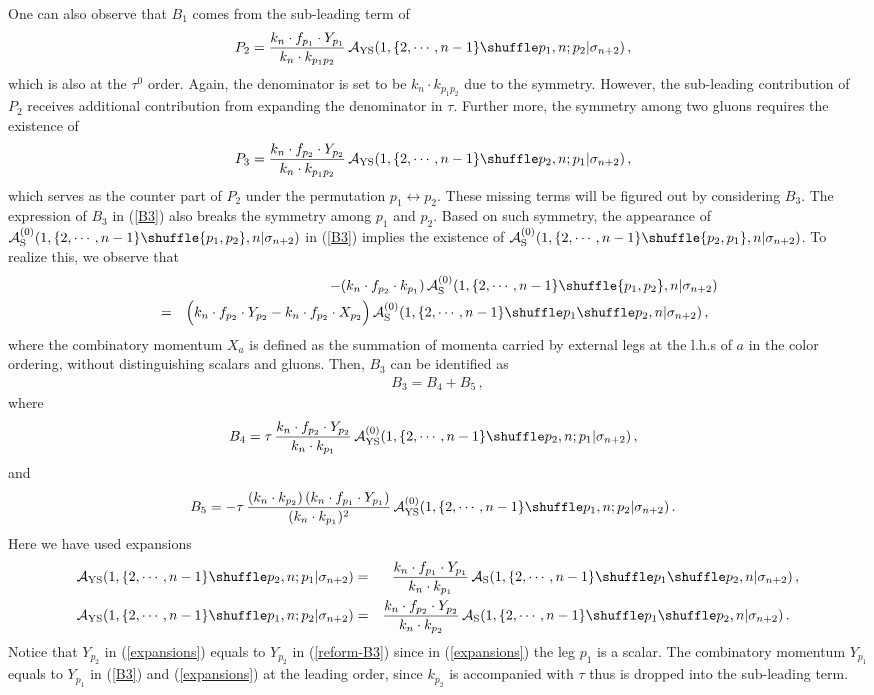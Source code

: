 \documentclass[11pt,a4paper]{article}
\newcommand{\bea}{\begin{eqnarray}}
\newcommand{\eea}{\end{eqnarray}}
\newcommand{\nn}{\nonumber \\}
\def\eref#1{(\ref{#1})}
\begin{document}
One can also observe that $B_1$ comes from the sub-leading term of
%
\bea
P_2={k_n\cdot f_{p_1}\cdot Y_{p_1}\over k_n\cdot k_{p_1p_2}}\,{\cal A}_{\rm YS}(1,\{2,\cdots,n-1\}\shuffle p_1,n;p_2|\sigma_{n+2})\,,~~\label{2g-P2}
\eea
%
which is also at the $\tau^0$ order. Again, the denominator is set to be $k_n\cdot k_{p_1p_2}$ due to the symmetry. However, the sub-leading contribution of $P_2$ receives additional contribution from expanding the denominator in $\tau$. Further more, the symmetry among two gluons requires the existence of
%
\bea
P_3={k_n\cdot f_{p_2}\cdot Y_{p_2}\over k_n\cdot k_{p_1p_2}}\,{\cal A}_{\rm YS}(1,\{2,\cdots,n-1\}\shuffle p_2,n;p_1|\sigma_{n+2})\,,~~\label{2g-P3}
\eea
%
which serves as the counter part of $P_2$ under the permutation $p_1\leftrightarrow p_2$.
These missing terms will be figured out by considering $B_3$. The expression of $B_3$ in \eref{B3} also breaks the symmetry among $p_1$ and $p_2$.
Based on such symmetry, the appearance of ${\cal A}^{(0)}_{\rm S}(1,\{2,\cdots,n-1\}\shuffle \{p_1,p_2\},n|\sigma_{n+2})$ in \eref{B3} implies the existence of ${\cal A}^{(0)}_{\rm S}(1,\{2,\cdots,n-1\}\shuffle \{p_2,p_1\},n|\sigma_{n+2})$. To realize this, we observe that
%
\bea
& &-(k_n\cdot f_{p_2}\cdot k_{p_1})\,{\cal A}^{(0)}_{\rm S}(1,\{2,\cdots,n-1\}\shuffle\{p_1,p_2\},n|\sigma_{n+2})\nn
&=&\Big(k_n\cdot f_{p_2}\cdot Y_{p_2}-k_n\cdot f_{p_2}\cdot X_{p_2} \Big)\,{\cal A}^{(0)}_{\rm S}(1,\{2,\cdots,n-1\}\shuffle p_1\shuffle p_2,n|\sigma_{n+2})\,,~~\label{reform-B3}
\eea
%
where the combinatory momentum $X_a$ is defined as the summation of momenta carried by external legs at the l.h.s of $a$ in the color ordering, without distinguishing scalars and gluons.
Then, $B_3$ can be identified as
%
\bea
B_3=B_4+B_5\,,
\eea
%
where
%
\bea
B_4=\tau\,{k_n\cdot f_{p_2}\cdot Y_{p_2}\over k_n\cdot k_{p_1}}\,{\cal A}^{(0)}_{\rm YS}(1,\{2,\cdots,n-1\}\shuffle p_2,n;p_1|\sigma_{n+2})\,,~~\label{B4}
\eea
%
and
%
\bea
B_5=-\tau\,{(k_n\cdot k_{p_2})\,(k_n\cdot f_{p_1}\cdot Y_{p_1})\over (k_n\cdot k_{p_1})^2}\,{\cal A}^{(0)}_{\rm YS}(1,\{2,\cdots,n-1\}\shuffle p_1,n;p_2|\sigma_{n+2})\,.~~\label{B5}
\eea
%
Here we have used expansions
%
\bea
{\cal A}_{\rm YS}(1,\{2,\cdots,n-1\}\shuffle p_2,n;p_1|\sigma_{n+2})&=&{k_n\cdot f_{p_1}\cdot Y_{p_1}\over k_n\cdot k_{p_1}}\,{\cal A}_{\rm S}(1,\{2,\cdots,n-1\}\shuffle p_1\shuffle p_2,n|\sigma_{n+2})\,,\nn
{\cal A}_{\rm YS}(1,\{2,\cdots,n-1\}\shuffle p_1,n;p_2|\sigma_{n+2})&=&{k_n\cdot f_{p_2}\cdot Y_{p_2}\over k_n\cdot k_{p_2}}\,{\cal A}_{\rm S}(1,\{2,\cdots,n-1\}\shuffle p_1\shuffle p_2,n|\sigma_{n+2})\,.~~\label{expansions}
\eea
%
Notice that $Y_{p_2}$ in \eref{expansions} equals to $Y_{p_2}$ in \eref{reform-B3} since in \eref{expansions} the leg $p_1$ is a scalar. The combinatory momentum $Y_{p_1}$ equals to $Y_{p_1}$ in \eref{B3} and \eref{expansions} at the leading order, since $k_{p_2}$ is accompanied with $\tau$ thus is dropped into the sub-leading term.
\end{document}
